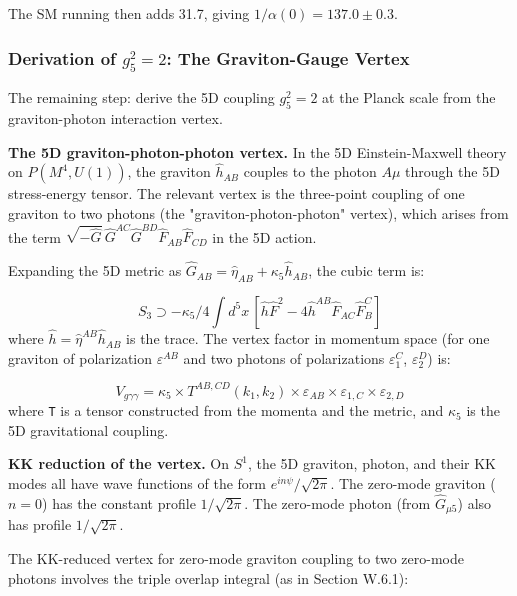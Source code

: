 \documentclass[aps,prd,preprint,superscriptaddress,longbibliography,floatfix]{revtex4-2}
\theoremstyle{remark}
\begin{document}
The SM running then adds 31.7, giving $1/\alpha(0) = 137.0 \pm 0.3$.


\subsubsection{Derivation of $g_{5}^{2} = 2$: The Graviton-Gauge Vertex}

The remaining step: derive the 5D coupling $g_{5}^{2} = 2$ at the Planck scale from the graviton-photon interaction vertex.

\textbf{The 5D graviton-photon-photon vertex.} In the 5D Einstein-Maxwell theory on $P(M^{4}, U(1))$, the graviton $\hat{h}_{AB}$ couples to the photon $A\mu$ through the 5D stress-energy tensor. The relevant vertex is the three-point coupling of one graviton to two photons (the "graviton-photon-photon" vertex), which arises from the term $\sqrt{-\hat{G}}\, \hat{G}^{AC} \hat{G}^{BD} \hat{F}_{AB} \hat{F}_{CD}$ in the 5D action.

Expanding the 5D metric as $\hat{G}_{AB} = \hat{\eta}_{AB} + \kappa_{5} \hat{h}_{AB}$, the cubic term is:


\begin{equation}
    S_{3} \supset -\kappa_{5}/4 \int d^{5}x\, [\hat{h} \hat{F}^{2} - 4 \hat{h}^{AB} \hat{F}_{AC} \hat{F}_B^C]
\end{equation}
where $\hat{h} = \hat{\eta}^{AB} \hat{h}_{AB}$ is the trace. The vertex factor in momentum space (for one graviton of polarization $\varepsilon^{AB}$ and two photons of polarizations $\varepsilon_{1}^C$, $\varepsilon_{2}^D$) is:


\begin{equation}
    V_{g\gamma\gamma} = \kappa_{5} \times T^{AB,CD}(k_{1}, k_{2}) \times \varepsilon_{AB} \times \varepsilon_{1,C} \times \varepsilon_{2,D}
\end{equation}
where \texttt{T} is a tensor constructed from the momenta and the metric, and $\kappa_{5}$ is the 5D gravitational coupling.

\textbf{KK reduction of the vertex.} On $S^{1}$, the 5D graviton, photon, and their KK modes all have wave functions of the form $e^{in\psi}/\sqrt{2\pi}$. The zero-mode graviton ($n = 0$) has the constant profile $1/\sqrt{2\pi}$. The zero-mode photon (from $\hat{G}_{\mu5}$) also has profile $1/\sqrt{2\pi}$.

The KK-reduced vertex for zero-mode graviton coupling to two zero-mode photons involves the triple overlap integral (as in Section W.6.1):
\end{document}
